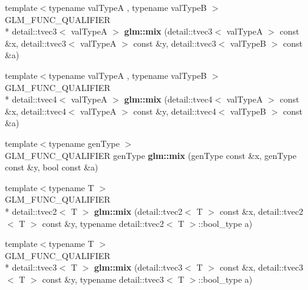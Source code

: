 \begin{DoxyCompactItemize}
\item 
\hypertarget{namespaceglm_a333a460f5247bcbfaaa3fdf290b566be}{{\footnotesize template$<$typename val\-Type\-A , typename val\-Type\-B $>$ }\\G\-L\-M\-\_\-\-F\-U\-N\-C\-\_\-\-Q\-U\-A\-L\-I\-F\-I\-E\-R \\*
detail\-::tvec3$<$ val\-Type\-A $>$ {\bfseries glm\-::mix} (detail\-::tvec3$<$ val\-Type\-A $>$ const \&x, detail\-::tvec3$<$ val\-Type\-A $>$ const \&y, detail\-::tvec3$<$ val\-Type\-B $>$ const \&a)}\label{namespaceglm_a333a460f5247bcbfaaa3fdf290b566be}

\item 
\hypertarget{namespaceglm_a690d992e126245867b84a16c04d7d11a}{{\footnotesize template$<$typename val\-Type\-A , typename val\-Type\-B $>$ }\\G\-L\-M\-\_\-\-F\-U\-N\-C\-\_\-\-Q\-U\-A\-L\-I\-F\-I\-E\-R \\*
detail\-::tvec4$<$ val\-Type\-A $>$ {\bfseries glm\-::mix} (detail\-::tvec4$<$ val\-Type\-A $>$ const \&x, detail\-::tvec4$<$ val\-Type\-A $>$ const \&y, detail\-::tvec4$<$ val\-Type\-B $>$ const \&a)}\label{namespaceglm_a690d992e126245867b84a16c04d7d11a}

\item 
\hypertarget{namespaceglm_a172536feafb5402782de75ba0b9105bc}{{\footnotesize template$<$typename gen\-Type $>$ }\\G\-L\-M\-\_\-\-F\-U\-N\-C\-\_\-\-Q\-U\-A\-L\-I\-F\-I\-E\-R gen\-Type {\bfseries glm\-::mix} (gen\-Type const \&x, gen\-Type const \&y, bool const \&a)}\label{namespaceglm_a172536feafb5402782de75ba0b9105bc}

\item 
\hypertarget{namespaceglm_a05ad08dcf9406a0f4fc653e91052cc7d}{{\footnotesize template$<$typename T $>$ }\\G\-L\-M\-\_\-\-F\-U\-N\-C\-\_\-\-Q\-U\-A\-L\-I\-F\-I\-E\-R \\*
detail\-::tvec2$<$ T $>$ {\bfseries glm\-::mix} (detail\-::tvec2$<$ T $>$ const \&x, detail\-::tvec2$<$ T $>$ const \&y, typename detail\-::tvec2$<$ T $>$\-::bool\-\_\-type a)}\label{namespaceglm_a05ad08dcf9406a0f4fc653e91052cc7d}

\item 
\hypertarget{namespaceglm_ae3f77298c77a5050ee511baee6d33044}{{\footnotesize template$<$typename T $>$ }\\G\-L\-M\-\_\-\-F\-U\-N\-C\-\_\-\-Q\-U\-A\-L\-I\-F\-I\-E\-R \\*
detail\-::tvec3$<$ T $>$ {\bfseries glm\-::mix} (detail\-::tvec3$<$ T $>$ const \&x, detail\-::tvec3$<$ T $>$ const \&y, typename detail\-::tvec3$<$ T $>$\-::bool\-\_\-type a)}\label{namespaceglm_ae3f77298c77a5050ee511baee6d33044}


\end{DoxyCompactItemize}
